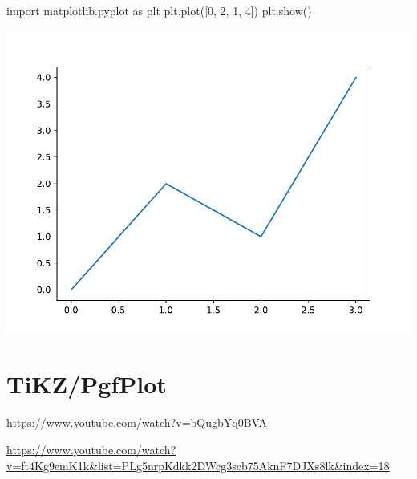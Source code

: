\documentclass[
]{book}
\newenvironment{Shaded}{\begin{snugshade}}{\end{snugshade}}
\newcommand{\CommentTok}[1]{\textcolor[rgb]{0.56,0.35,0.01}{\textit{#1}}}
\newcommand{\DecValTok}[1]{\textcolor[rgb]{0.00,0.00,0.81}{#1}}
\newcommand{\ImportTok}[1]{#1}
\newcommand{\NormalTok}[1]{#1}
\theoremstyle{definition}
\theoremstyle{definition}
\theoremstyle{definition}
\theoremstyle{definition}
\theoremstyle{remark}
\begin{document}
\begin{Shaded}
\end{Shaded}

\begin{Shaded}
\begin{Highlighting}[]
\ImportTok{import}\NormalTok{ matplotlib.pyplot }\ImportTok{as}\NormalTok{ plt}
\NormalTok{plt.plot([}\DecValTok{0}\NormalTok{, }\DecValTok{2}\NormalTok{, }\DecValTok{1}\NormalTok{, }\DecValTok{4}\NormalTok{])}
\NormalTok{plt.show()}
\end{Highlighting}
\end{Shaded}

\includegraphics{202401292317-Python_files/figure-latex/unnamed-chunk-8-1.pdf}

\hypertarget{tikzpgfplot-1}{%
\chapter*{TiKZ/PgfPlot}\label{tikzpgfplot-1}}

\url{https://www.youtube.com/watch?v=bQugbYq0BVA}

\url{https://www.youtube.com/watch?v=ft4Kg9emK1k\&list=PLg5nrpKdkk2DWcg3scb75AknF7DJXs8lk\&index=18}
\end{document}
